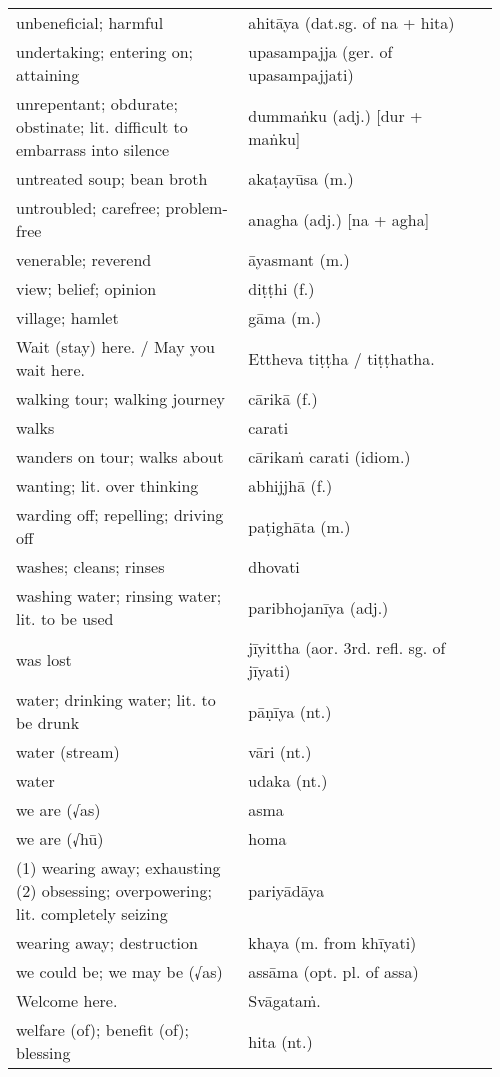 \documentclass[a5paper]{memoir}
\begin{document}
\begin{longtable}{L{0.48\linewidth} L{0.48\linewidth} H}
unbeneficial; harmful & ahitāya (dat.sg. of na + hita) & \\[0pt]
undertaking; entering on; attaining & upasampajja (ger. of upasampajjati) & \\[0pt]
unrepentant; obdurate; obstinate; lit. difficult to embarrass into silence & dummaṅku (adj.) [dur + maṅku] & \\[0pt]
untreated soup; bean broth & akaṭayūsa (m.) & \\[0pt]
untroubled; carefree; problem-free & anagha (adj.) [na + agha] & \\[0pt]
venerable; reverend & āyasmant (m.) & \\[0pt]
view; belief; opinion & diṭṭhi (f.) & \\[0pt]
village; hamlet & gāma (m.) & \\[0pt]
Wait (stay) here. / May you wait here. & Ettheva tiṭṭha / tiṭṭhatha. & \\[0pt]
walking tour; walking journey & cārikā (f.) & \\[0pt]
walks & carati & \\[0pt]
wanders on tour; walks about & cārikaṁ carati (idiom.) & \\[0pt]
wanting; lit. over thinking & abhijjhā (f.) & \\[0pt]
warding off; repelling; driving off & paṭighāta (m.) & \\[0pt]
washes; cleans; rinses & dhovati & \\[0pt]
washing water; rinsing water; lit. to be used & paribhojanīya (adj.) & \\[0pt]
was lost & jīyittha (aor. 3rd. refl. sg. of jīyati) & \\[0pt]
water; drinking water; lit. to be drunk & pāṇīya (nt.) & \\[0pt]
water (stream) & vāri (nt.) & \\[0pt]
water & udaka (nt.) & \\[0pt]
we are (√as) & asma & \\[0pt]
we are (√hū) & homa & \\[0pt]
(1) wearing away; exhausting (2) obsessing; overpowering; lit. completely seizing & pariyādāya & \\[0pt]
wearing away; destruction & khaya (m. from khīyati) & \\[0pt]
we could be; we may be (√as) & assāma (opt. pl. of assa) & \\[0pt]
Welcome here. & Svāgataṁ. & \\[0pt]
welfare (of); benefit (of); blessing & hita (nt.) & \\[0pt]

\end{longtable}
\end{document}
